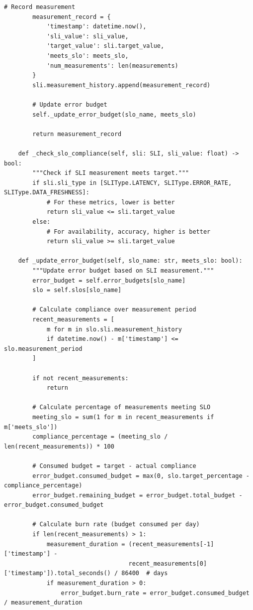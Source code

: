 \begin{lstlisting}[style=python, caption={SLIs and SLOs for ML systems}]
        # Record measurement
        measurement_record = {
            'timestamp': datetime.now(),
            'sli_value': sli_value,
            'target_value': sli.target_value,
            'meets_slo': meets_slo,
            'num_measurements': len(measurements)
        }
        sli.measurement_history.append(measurement_record)

        # Update error budget
        self._update_error_budget(slo_name, meets_slo)

        return measurement_record

    def _check_slo_compliance(self, sli: SLI, sli_value: float) -> bool:
        """Check if SLI measurement meets target."""
        if sli.sli_type in [SLIType.LATENCY, SLIType.ERROR_RATE, SLIType.DATA_FRESHNESS]:
            # For these metrics, lower is better
            return sli_value <= sli.target_value
        else:
            # For availability, accuracy, higher is better
            return sli_value >= sli.target_value

    def _update_error_budget(self, slo_name: str, meets_slo: bool):
        """Update error budget based on SLI measurement."""
        error_budget = self.error_budgets[slo_name]
        slo = self.slos[slo_name]

        # Calculate compliance over measurement period
        recent_measurements = [
            m for m in slo.sli.measurement_history
            if datetime.now() - m['timestamp'] <= slo.measurement_period
        ]

        if not recent_measurements:
            return

        # Calculate percentage of measurements meeting SLO
        meeting_slo = sum(1 for m in recent_measurements if m['meets_slo'])
        compliance_percentage = (meeting_slo / len(recent_measurements)) * 100

        # Consumed budget = target - actual compliance
        error_budget.consumed_budget = max(0, slo.target_percentage - compliance_percentage)
        error_budget.remaining_budget = error_budget.total_budget - error_budget.consumed_budget

        # Calculate burn rate (budget consumed per day)
        if len(recent_measurements) > 1:
            measurement_duration = (recent_measurements[-1]['timestamp'] -
                                   recent_measurements[0]['timestamp']).total_seconds() / 86400  # days
            if measurement_duration > 0:
                error_budget.burn_rate = error_budget.consumed_budget / measurement_duration


\end{lstlisting}
